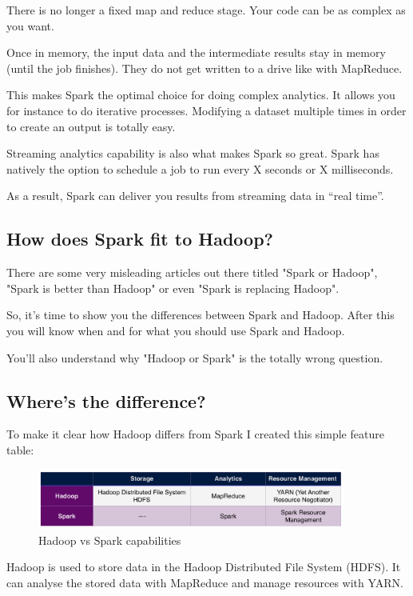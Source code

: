 \documentclass[12pt, numbers=noenddot]{scrreprt} %
\begin{document}
There is no longer a fixed map and reduce stage. Your code can be as complex as you want.

Once in memory, the input data and the intermediate results stay in memory (until the job finishes). They do not get written to a drive like with MapReduce.

This makes Spark the optimal choice for doing complex analytics. It allows you for instance to do iterative processes. Modifying a dataset multiple times in order to create an output is totally easy.

Streaming analytics capability is also what makes Spark so great. Spark has natively the option to schedule a job to run every X seconds or X milliseconds.

As a result, Spark can deliver you results from streaming data in “real time”.


\subsection{How does Spark fit to Hadoop?}

There are some very misleading articles out there titled "Spark or Hadoop", "Spark is better than Hadoop" or even "Spark is replacing Hadoop".

So, it's time to show you the differences between Spark and Hadoop. After this you will know when and for what you should use Spark and Hadoop.

You’ll also understand why "Hadoop or Spark" is the totally wrong question.

\subsection{Where's the difference?}
To make it clear how Hadoop differs from Spark I created this simple feature table:

\begin{figure}[htbp]
  \centering
     \includegraphics[width=0.9\textwidth]{images/Table-Hadoop-and-Spark.png}
  \caption{Hadoop vs Spark capabilities}
  \label{fig:Bild1}
\end{figure}

Hadoop is used to store data in the Hadoop Distributed File System (HDFS). It can analyse the stored data with MapReduce and manage resources with YARN.
\end{document}
